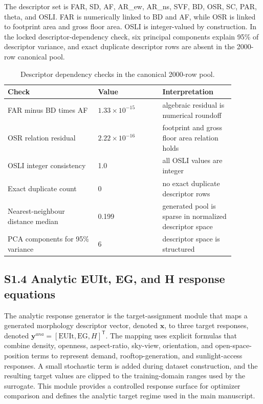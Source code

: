 \documentclass[11pt]{article}
\begin{document}
The descriptor set is FAR, SD, AF, AR\_ew, AR\_ns, SVF, BD, OSR, SC, PAR, theta, and OSLI. FAR is numerically linked to BD and AF, while OSR is linked to footprint area and gross floor area. OSLI is integer-valued by construction. In the locked descriptor-dependency check, six principal components explain 95\% of descriptor variance, and exact duplicate descriptor rows are absent in the 2000-row canonical pool.

\begin{table}[H]
\caption{Descriptor dependency checks in the canonical 2000-row pool.}
\label{tab:s-dependencies}
\centering
\footnotesize
\begin{tabularx}{\linewidth}{@{}p{0.35\linewidth}p{0.25\linewidth}p{0.28\linewidth}@{}}
\toprule
Check & Value & Interpretation \\
\midrule
FAR minus BD times AF & $1.33\times10^{-15}$ & algebraic residual is numerical roundoff \\
OSR relation residual & $2.22\times10^{-16}$ & footprint and gross floor area relation holds \\
OSLI integer consistency & 1.0 & all OSLI values are integer \\
Exact duplicate count & 0 & no exact duplicate descriptor rows \\
Nearest-neighbour distance median & 0.199 & generated pool is sparse in normalized descriptor space \\
PCA components for 95\% variance & 6 & descriptor space is structured \\
\bottomrule
\end{tabularx}
\end{table}

\subsection*{S1.4 Analytic EUIt, EG, and H response equations}

The analytic response generator is the target-assignment module that maps a generated morphology descriptor vector, denoted $\mathbf{x}$, to three target responses, denoted $\mathbf{y}^{ana}=[\mathrm{EUIt},\mathrm{EG},H]^\mathsf{T}$. The mapping uses explicit formulas that combine density, openness, aspect-ratio, sky-view, orientation, and open-space-position terms to represent demand, rooftop-generation, and sunlight-access responses. A small stochastic term is added during dataset construction, and the resulting target values are clipped to the training-domain ranges used by the surrogate. This module provides a controlled response surface for optimizer comparison and defines the analytic target regime used in the main manuscript.
\end{document}

